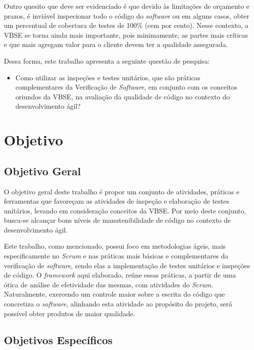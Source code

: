 Outro quesito que deve ser evidenciado é que devido às limitações de orçamento e prazos, é inviável inspecionar todo o código do \textit{software} ou em alguns casos, obter um percentual de cobertura de testes de 100\% (cem por cento). Nesse contexto, a VBSE se torna ainda mais importante, pois minimamente, as partes mais críticas e que mais agregam valor para o cliente devem ter a qualidade assegurada.

Dessa forma, este trabalho apresenta a seguinte questão de pesquisa:

\begin{itemize}
	\item Como utilizar as inspeções e testes unitários, que são práticas complementares da Verificação de \textit{Software}, em conjunto com os conceitos oriundos da VBSE, na avaliação da qualidade de código no contexto do desenvolvimento ágil?
\end{itemize}

\section{Objetivo}

\subsection{Objetivo Geral}

O objetivo geral deste trabalho é propor um conjunto de atividades, práticas e ferramentas que favoreçam as atividades de inspeção e elaboração de testes unitários, levando em consideração conceitos da VBSE. Por meio deste conjunto, busca-se alcançar bons níveis de manutenibilidade de código no contexto de desenvolvimento ágil.

Este trabalho, como mencionado, possui foco em metodologias ágeis, mais especificamente no \textit{Scrum} e nas práticas mais básicas e complementares da verificação de \textit{software}, sendo elas a implementação de testes unitários e inspeções de código. O \textit{framework} aqui elaborado, reúne essas práticas, a partir de uma ótica de análise de efetividade das mesmas, com atividades do \textit{Scrum}. Naturalmente, exercendo um controle maior sobre a escrita do código que concretiza o \textit{software}, alinhando esta atividade ao propósito do projeto, será possível obter produtos de maior qualidade.

\subsection{Objetivos Específicos}

